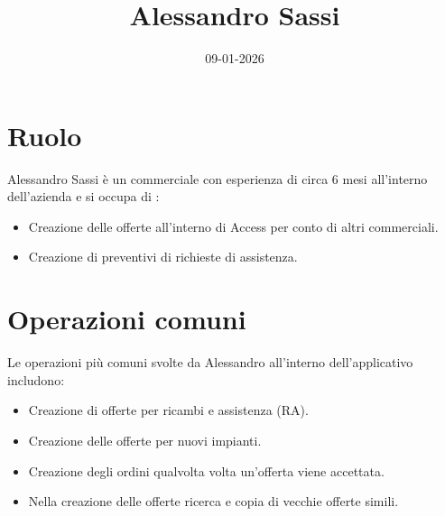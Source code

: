 \documentclass[12pt, a4paper]{article} %
\title{Alessandro Sassi}
\date{09-01-2026}
\begin{document}
\maketitle

\section{Ruolo}
Alessandro Sassi è un commerciale con esperienza di circa 6 mesi all'interno dell'azienda e si occupa di :
\begin{itemize}
      \item Creazione delle offerte all'interno di Access per conto di altri commerciali.
      \item Creazione di preventivi di richieste di assistenza.
\end{itemize}

\section{Operazioni comuni}
Le operazioni più comuni svolte da Alessandro all'interno dell'applicativo
includono:
\begin{itemize}
      \item Creazione di offerte per ricambi e assistenza (RA).
      \item Creazione delle offerte per nuovi impianti.
      \item Creazione degli ordini qualvolta volta un'offerta viene accettata.
      \item Nella creazione delle offerte ricerca e copia di vecchie offerte simili.
\end{itemize}
\end{document}
